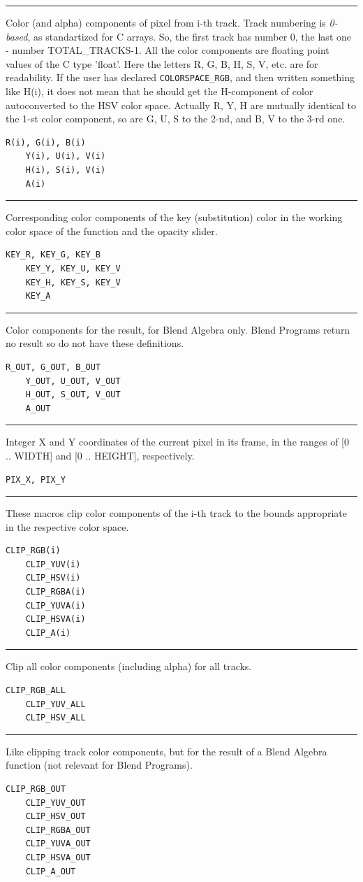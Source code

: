 \hrule
Color (and alpha) components of pixel from i-th track. Track numbering is \textit{0-based}, as standartized for C arrays.  So, the first track has number 0, the last one - number TOTAL\_TRACKS-1. All the color components are floating point values of the C type 'float'.
Here the letters R, G, B, H, S, V, etc. are for readability. If the user has declared \texttt{COLORSPACE\_RGB}, and then written something like H(i), it does not mean that he should get the H-component of color autoconverted to the HSV color space. Actually R, Y, H are mutually identical to the 1-st color component, so are G, U, S to the 2-nd, and B, V to the 3-rd one.
\begin{lstlisting}[style=sh]
	R(i), G(i), B(i)
	Y(i), U(i), V(i)
	H(i), S(i), V(i)
	A(i)
\end{lstlisting}

\hrule
Corresponding color components of the key (substitution) color in the working color space of the function and the opacity slider.
\begin{lstlisting}[style=sh]
	KEY_R, KEY_G, KEY_B
	KEY_Y, KEY_U, KEY_V
	KEY_H, KEY_S, KEY_V
	KEY_A
\end{lstlisting}

\hrule
Color components for the result, for Blend Algebra only. Blend Programs return no result so do not have these definitions.
\begin{lstlisting}[style=sh]
	R_OUT, G_OUT, B_OUT
	Y_OUT, U_OUT, V_OUT
	H_OUT, S_OUT, V_OUT
	A_OUT
\end{lstlisting}

\hrule
Integer X and Y coordinates of the current pixel in its frame, in the ranges of [0 .. WIDTH] and [0 .. HEIGHT], respectively.
\begin{lstlisting}[style=sh]
	PIX_X, PIX_Y
\end{lstlisting}

\hrule
These macros clip color components of the i-th track to the bounds appropriate in the respective color space.
\begin{lstlisting}[style=sh]
	CLIP_RGB(i)
	CLIP_YUV(i)
	CLIP_HSV(i)
	CLIP_RGBA(i)
	CLIP_YUVA(i)
	CLIP_HSVA(i)
	CLIP_A(i)
\end{lstlisting}

\hrule
Clip all color components (including alpha) for all tracks.
\begin{lstlisting}[style=sh]
	CLIP_RGB_ALL
	CLIP_YUV_ALL
	CLIP_HSV_ALL
\end{lstlisting}

\hrule
Like clipping track color components, but for the result of a Blend Algebra function (not relevant for Blend Programs). 
\begin{lstlisting}[style=sh]
	CLIP_RGB_OUT
	CLIP_YUV_OUT
	CLIP_HSV_OUT
	CLIP_RGBA_OUT
	CLIP_YUVA_OUT
	CLIP_HSVA_OUT
	CLIP_A_OUT
\end{lstlisting}

